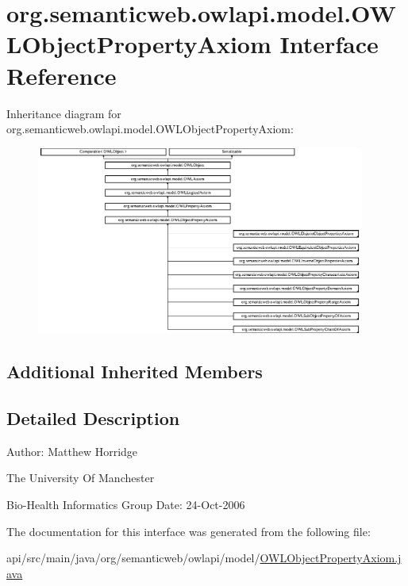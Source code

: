 \hypertarget{interfaceorg_1_1semanticweb_1_1owlapi_1_1model_1_1_o_w_l_object_property_axiom}{\section{org.\-semanticweb.\-owlapi.\-model.\-O\-W\-L\-Object\-Property\-Axiom Interface Reference}
\label{interfaceorg_1_1semanticweb_1_1owlapi_1_1model_1_1_o_w_l_object_property_axiom}
}
Inheritance diagram for org.\-semanticweb.\-owlapi.\-model.\-O\-W\-L\-Object\-Property\-Axiom\-:\begin{figure}[H]
\begin{center}
\leavevmode
\includegraphics[height=6.178093cm]{interfaceorg_1_1semanticweb_1_1owlapi_1_1model_1_1_o_w_l_object_property_axiom}
\end{center}
\end{figure}
\subsection*{Additional Inherited Members}


\subsection{Detailed Description}
Author\-: Matthew Horridge\par
 The University Of Manchester\par
 Bio-\/\-Health Informatics Group Date\-: 24-\/\-Oct-\/2006 

The documentation for this interface was generated from the following file\-:\begin{DoxyCompactItemize}
\item 
api/src/main/java/org/semanticweb/owlapi/model/\hyperlink{_o_w_l_object_property_axiom_8java}{O\-W\-L\-Object\-Property\-Axiom.\-java}\end{DoxyCompactItemize}
